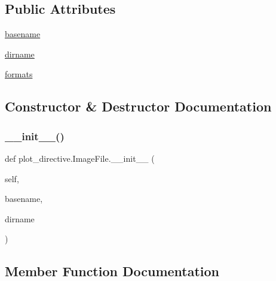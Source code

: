 \subsection*{Public Attributes}
\begin{DoxyCompactItemize}
\item 
\mbox{\hyperlink{classplot__directive_1_1ImageFile_afa0e2d74c60b443628f731c96c7b1cb0}{basename}}
\item 
\mbox{\hyperlink{classplot__directive_1_1ImageFile_ab3f5e486f644bc939202814ecd5aec0c}{dirname}}
\item 
\mbox{\hyperlink{classplot__directive_1_1ImageFile_a0f0c93edf1d8f29aa7a62bd8bf7621b0}{formats}}
\end{DoxyCompactItemize}


\subsection{Constructor \& Destructor Documentation}
\mbox{\label{classplot__directive_1_1ImageFile_a6c55e9ecf36e33f3faa0442a4ff1b1fb}} 
\subsubsection{\texorpdfstring{\+\_\+\+\_\+init\+\_\+\+\_\+()}{\_\_init\_\_()}}
{\footnotesize\ttfamily def plot\+\_\+directive.\+Image\+File.\+\_\+\+\_\+init\+\_\+\+\_\+ (\begin{DoxyParamCaption}\item[{}]{self,  }\item[{}]{basename,  }\item[{}]{dirname }\end{DoxyParamCaption})}



\subsection{Member Function Documentation}
\mbox{\label{classplot__directive_1_1ImageFile_ac0eb49bf3591003e4ffb6cca0c626eda}} 
